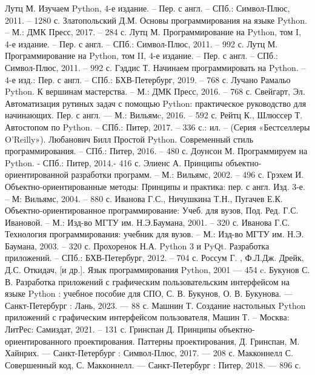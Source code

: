 
\begin{thebibliography}{9}

     Лутц М. Изучаем Python, 4-е издание. – Пер. с англ. – СПб.: Символ-Плюс, 2011. – 1280 с.
     Златопольский Д.М. Основы программирования на языке Python. – М.: ДМК Пресс, 2017. – 284 с.
     Лутц М. Программирование на Python, том I, 4-е издание. – Пер. с англ. – СПб.: Символ-Плюс, 2011. – 992 с.
     Лутц М. Программирование на Python, том II, 4-е издание. – Пер. с англ. – СПб.: Символ-Плюс, 2011. – 992 с.
	 Гэддис Т. Начинаем программировать на Python.  – 4-е изд.: Пер. с англ. – СПб.: БХВ-Петербург, 2019. – 768 с.
	 Лучано Рамальо Python. К вершинам мастерства. – М.: ДМК Пресс, 2016. – 768 с.
	 Свейгарт, Эл. Автоматизация рутиных задач с помощью Python: практическое руководство для начинающих. Пер. с англ. — М.: Вильямc, 2016. – 592 с.
	 Рейтц К., Шлюссер Т. Автостопом по Python. – СПб.: Питер, 2017. – 336 с.: ил. – (Серия «Бестселлеры O’Reilly»).
	 Любанович Билл Простой Python. Современный стиль программирования. – СПб.: Питер, 2016. – 480 с.
	 Доунсон М. Программируем на Python. - СПб.: Питер, 2014.- 416 с.
	 Элиенс А. Принципы объектно-ориентированной разработки программ. – М.: Вильямс, 2002. – 496 с.
	 Грэхем И. Объектно-ориентированные методы: Принципы и практика: пер. с англ. Изд. 3-е. – М: Вильямс, 2004. – 880 с.
	 Иванова Г.С., Ничушкина Т.Н., Пугачев Е.К. Объектно-ориентированное программирование: Учеб. для вузов, Под. Ред. Г.С. Ивановой. – М.: Изд-во МГТУ им. Н.Э.Баумана, 2001. – 320 с.
	 Иванова Г.С. Технология программирования: учебник для вузов. – М.: Изд-во МГТУ им. Н.Э. Баумана, 2003. – 320 с.
	 Прохоренок Н.А. Python 3 и PyQt. Разработка приложений. – СПб.: БХВ-Петербург, 2012. – 704 с.
	 Россум Г. , Ф.Л.Дж. Дрейк, Д.С. Откидач, [и др.]. Язык программирования Python, 2001 — 454 c.
	 Букунов С. В. Разработка приложений с графическим пользовательским интерфейсом на языке Python : учебное пособие для СПО, С. В. Букунов, О. В. Букунова. — Санкт-Петербург : Лань, 2023. — 88 с.
	 Машнин Т. Создание настольных Python приложений с графическим интерфейсом пользователя, Машин Т. – Москва: ЛитРес: Самиздат, 2021. – 131 с.
	 Гринспан Д. Принципы объектно-ориентированного проектирования. Паттерны проектирования, Д. Гринспан, М. Хайнрих. — Санкт-Петербург : Символ-Плюс, 2017. — 208 с.
	 Макконнелл С. Совершенный код, С. Макконнелл. — Санкт-Петербург : Питер, 2018. — 896 с.
\end{thebibliography}
